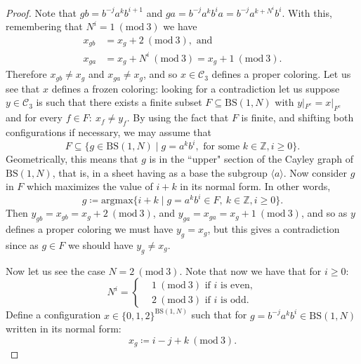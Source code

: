 \documentclass[letterpaper,10pt]{amsart}
\theoremstyle{plain}
\newcommand{\BS}[1][N]{\mathrm{BS}(1,#1)}
\begin{document}
\begin{proof}
	Note that $gb=b^{-j}a^k b^{i+1}$ and $ga=b^{-j}a^k b^ia=b^{-j}a^{k+N^i}b^i$. With this, remembering that $N^i =1 \ (\mathrm{mod} \ 3)$ we have
	\begin{align*}
	x_{gb}&=x_g+2 \ (\mathrm{mod} \ 3), \text{ and} \\
	x_{ga}&=x_g+N^i \ (\mathrm{mod} \ 3) =x_g+1 \ (\mathrm{mod} \ 3).
	\end{align*}
	Therefore $x_{gb}\neq x_g$ and $x_{ga}\neq x_g$, and so $x\in \mathcal{C}_3$ defines a proper coloring. Let us see that $x$ defines a frozen coloring: looking for a contradiction let us suppose $y\in \mathcal{C}_3$ is such that there exists a finite subset $F\subseteq \BS$ with $y|_{F^ c}=x|_{F^c}$ and for every $f\in F: \ x_f\neq y_f$. By using the fact that $F$ is finite, and shifting both configurations if necessary, we may assume that $$F\subseteq \{g\in \BS\mid g=a^kb^i, \text{ for some }k\in \mathbb{Z}, i\ge 0\}.$$ 
	Geometrically, this means that $g$ is in the ``upper" section of the Cayley graph of $\BS$, that is, in a sheet having as a base the subgroup $\langle a\rangle$. Now consider $g$ in $F$ which maximizes the value of $i+k$ in its normal form. In other words,
	$$
	g\coloneqq \mathrm{argmax}\{i+k\mid g=a^kb^i\in F, \ k\in \mathbb{Z}, i\ge 0 \}.
	$$
	Then $y_{gb}=x_{gb}=x_g+2\ (\mathrm{mod} \ 3)$, and $y_{ga}=x_{ga}=x_g+1\ (\mathrm{mod} \ 3)$, and so as $y$ defines a proper coloring we must have $y_g=x_g$, but this gives a contradiction since as $g\in F$ we should have $y_g\neq x_g$.
	
	
	Now let us see the case $N=2\ (\mathrm{mod} \ 3)$. Note that now we have that for $i\ge 0$:
	\begin{equation*}	
	N^i=\left\{ 
	\begin{aligned}
	&1 \ (\mathrm{mod} \ 3) \text{ if }i\text{ is even}, \\
	&2 \ (\mathrm{mod} \ 3) \text{ if }i\text{ is odd.} 
	\end{aligned}
	\right.
	\end{equation*}
	Define a configuration  $x\in \{0,1,2\}^{\BS}$ such that for $g=b^{-j}a^k b^i\in \BS$ written in its normal form:
	$$
	x_g\coloneqq i-j+k \ (\mathrm{mod} \ 3).
	$$
	

\end{proof}
\end{document}
